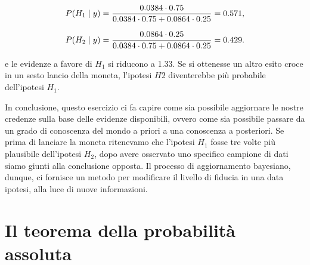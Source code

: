 \documentclass[
  11pt,
]{krantz}
\theoremstyle{definition}
\theoremstyle{definition}
\theoremstyle{definition}
\theoremstyle{definition}
\theoremstyle{remark}
\begin{document}
\begin{equation}
P(H_1 \mid y) = \frac{0.0384 \cdot 0.75}{0.0384 \cdot 0.75 + 0.0864 \cdot 0.25} = 0.571,\notag
\end{equation}

\begin{equation}
P(H_2 \mid y) = \frac{0.0864 \cdot 0.25}{0.0384 \cdot 0.75 + 0.0864 \cdot 0.25} = 0.429.\notag
\end{equation}

e le evidenze a favore di \(H_1\) si riducono a 1.33. Se si ottenesse un altro esito croce in un sesto lancio della moneta, l'ipotesi \(H2\) diventerebbe più probabile dell'ipotesi \(H_1\).

In conclusione, questo esercizio ci fa capire come sia possibile aggiornare le nostre credenze sulla base delle evidenze disponibili, ovvero come sia possibile passare da un grado di conoscenza del mondo a priori a una conoscenza a posteriori. Se prima di lanciare la moneta ritenevamo che l'ipotesi \(H_1\) fosse tre volte più plausibile dell'ipotesi \(H_2\), dopo avere osservato uno specifico campione di dati siamo giunti alla conclusione opposta. Il processo di aggiornamento bayesiano, dunque, ci fornisce un metodo per modificare il livello di fiducia in una data ipotesi, alla luce di nuove informazioni.

\hypertarget{appendix:exrc-abs-prob}{%
\chapter{Il teorema della probabilità assoluta}\label{appendix:exrc-abs-prob}}
\end{document}
